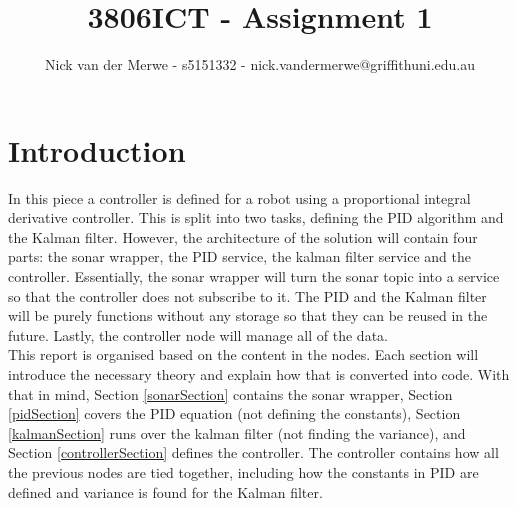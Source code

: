 \documentclass{article}
\title{3806ICT - Assignment 1}
\author{Nick van der Merwe - s5151332 - nick.vandermerwe@griffithuni.edu.au}
\newcommand\tab[1][1cm]{\hspace*{#1}}
\begin{document}
\maketitle
\section{Introduction}
In this piece a controller is defined for a robot using a proportional integral
derivative controller. This is split into two tasks, defining the PID algorithm
and the Kalman filter. However, the architecture of the solution will contain
four parts: the sonar wrapper, the PID service, the kalman filter service and
the controller. Essentially, the sonar wrapper will turn the sonar topic into a
service so that the controller does not subscribe to it. The PID and the Kalman
filter will be purely functions without any storage so that they can be reused
in the future. Lastly, the controller node will manage all of the data. \\
\tab This report is organised based on the content in the nodes. Each section
will introduce the necessary theory and explain how that is converted into code.
With that in mind, Section \ref{sonarSection} contains the sonar wrapper,
Section \ref{pidSection} covers the PID equation (not defining the constants), 
Section \ref{kalmanSection} runs over the kalman filter (not finding the
variance), and Section \ref{controllerSection} defines the controller. The
controller contains how all the previous nodes are tied together, including how
the constants in PID are defined and variance is found for the Kalman filter.
\end{document}
